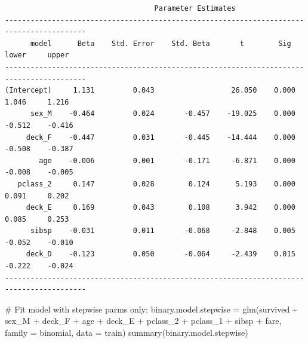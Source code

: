 \documentclass[
  letterpaper,
  DIV=11,
  numbers=noendperiod]{scrartcl}
\newenvironment{Shaded}{\begin{snugshade}}{\end{snugshade}}
\newcommand{\AttributeTok}[1]{\textcolor[rgb]{0.40,0.45,0.13}{#1}}
\newcommand{\CommentTok}[1]{\textcolor[rgb]{0.37,0.37,0.37}{#1}}
\newcommand{\FunctionTok}[1]{\textcolor[rgb]{0.28,0.35,0.67}{#1}}
\newcommand{\NormalTok}[1]{\textcolor[rgb]{0.00,0.23,0.31}{#1}}
\newcommand{\OtherTok}[1]{\textcolor[rgb]{0.00,0.23,0.31}{#1}}
\newcommand{\SpecialCharTok}[1]{\textcolor[rgb]{0.37,0.37,0.37}{#1}}
\begin{document}
\begin{verbatim}
                                   Parameter Estimates                                    
-----------------------------------------------------------------------------------------
      model      Beta    Std. Error    Std. Beta       t        Sig      lower     upper 
-----------------------------------------------------------------------------------------
(Intercept)     1.131         0.043                  26.050    0.000     1.046     1.216 
      sex_M    -0.464         0.024       -0.457    -19.025    0.000    -0.512    -0.416 
     deck_F    -0.447         0.031       -0.445    -14.444    0.000    -0.508    -0.387 
        age    -0.006         0.001       -0.171     -6.871    0.000    -0.008    -0.005 
   pclass_2     0.147         0.028        0.124      5.193    0.000     0.091     0.202 
     deck_E     0.169         0.043        0.108      3.942    0.000     0.085     0.253 
      sibsp    -0.031         0.011       -0.068     -2.848    0.005    -0.052    -0.010 
     deck_D    -0.123         0.050       -0.064     -2.439    0.015    -0.222    -0.024 
-----------------------------------------------------------------------------------------
\end{verbatim}

\begin{Shaded}
\begin{Highlighting}[]
\CommentTok{\# Fit model with stepwise parms only:}
\NormalTok{binary.model.stepwise }\OtherTok{=} \FunctionTok{glm}\NormalTok{(survived }\SpecialCharTok{\textasciitilde{}}\NormalTok{ sex\_M }\SpecialCharTok{+}\NormalTok{ deck\_F  }\SpecialCharTok{+}\NormalTok{ age }\SpecialCharTok{+}\NormalTok{ deck\_E  }\SpecialCharTok{+} 
\NormalTok{                              pclass\_2 }\SpecialCharTok{+}\NormalTok{ pclass\_1 }\SpecialCharTok{+}\NormalTok{ sibsp }\SpecialCharTok{+}\NormalTok{ fare, }
                            \AttributeTok{family =}\NormalTok{ binomial, }\AttributeTok{data =}\NormalTok{ train)}
\FunctionTok{summary}\NormalTok{(binary.model.stepwise)}
\end{Highlighting}
\end{Shaded}
\end{document}
